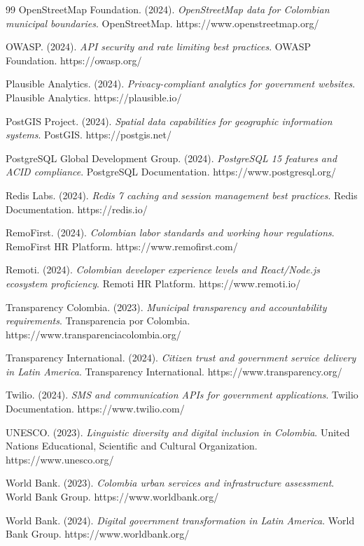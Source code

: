 \documentclass[12pt,a4paper]{article}
\begin{document}
\begin{thebibliography}{99}
 OpenStreetMap Foundation. (2024). \emph{OpenStreetMap data for Colombian municipal boundaries}. OpenStreetMap. https://www.openstreetmap.org/

 OWASP. (2024). \emph{API security and rate limiting best practices}. OWASP Foundation. https://owasp.org/

 Plausible Analytics. (2024). \emph{Privacy-compliant analytics for government websites}. Plausible Analytics. https://plausible.io/

 PostGIS Project. (2024). \emph{Spatial data capabilities for geographic information systems}. PostGIS. https://postgis.net/

 PostgreSQL Global Development Group. (2024). \emph{PostgreSQL 15 features and ACID compliance}. PostgreSQL Documentation. https://www.postgresql.org/

 Redis Labs. (2024). \emph{Redis 7 caching and session management best practices}. Redis Documentation. https://redis.io/

 RemoFirst. (2024). \emph{Colombian labor standards and working hour regulations}. RemoFirst HR Platform. https://www.remofirst.com/

 Remoti. (2024). \emph{Colombian developer experience levels and React/Node.js ecosystem proficiency}. Remoti HR Platform. https://www.remoti.io/

 Transparency Colombia. (2023). \emph{Municipal transparency and accountability requirements}. Transparencia por Colombia. https://www.transparenciacolombia.org/

 Transparency International. (2024). \emph{Citizen trust and government service delivery in Latin America}. Transparency International. https://www.transparency.org/

 Twilio. (2024). \emph{SMS and communication APIs for government applications}. Twilio Documentation. https://www.twilio.com/

 UNESCO. (2023). \emph{Linguistic diversity and digital inclusion in Colombia}. United Nations Educational, Scientific and Cultural Organization. https://www.unesco.org/

 World Bank. (2023). \emph{Colombia urban services and infrastructure assessment}. World Bank Group. https://www.worldbank.org/

 World Bank. (2024). \emph{Digital government transformation in Latin America}. World Bank Group. https://www.worldbank.org/

\end{thebibliography}
\end{document}

